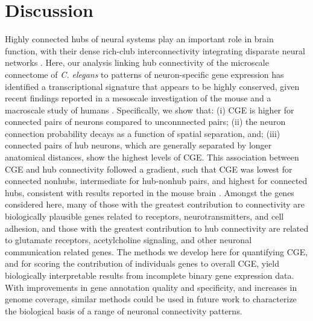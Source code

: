 \documentclass[10pt,letterpaper]{article}
\begin{document}
{\section*{Discussion}
Highly connected hubs of neural systems play an important role in brain function, with their dense rich-club interconnectivity integrating disparate neural networks \cite{vandenHeuvel:2013ge, Fornito2015, deReus:2013cy, vandenHeuvel:2013ij}.
Here, our analysis linking hub connectivity of the microscale connectome of \emph{C. elegans} to patterns of neuron-specific gene expression has identified a transcriptional signature that appears to be highly conserved, given recent findings reported in a mesoscale investigation of the mouse \cite{Fulcher:2016ck} and a macroscale study of humans \cite{Vertes2016a}.
Specifically, we show that:
(i) CGE is higher for connected pairs of neurons compared to unconnnected pairs;
(ii) the neuron connection probability decays as a function of spatial separation, and;
(iii) connected pairs of hub neurons, which are generally separated by longer anatomical distances, show the highest levels of CGE.
This association between CGE and hub connectivity followed a gradient, such that CGE was lowest for connected nonhubs, intermediate for hub-nonhub pairs, and highest for connected hubs, consistent with results reported in the mouse brain \cite{Fulcher:2016ck}.
Amongst the genes considered here, many of those with the greatest contribution to connectivity are biologically plausible genes related to receptors, neurotransmitters, and cell adhesion, and those with the greatest contribution to hub connectivity are related to glutamate receptors, acetylcholine signaling, and other neuronal communication related genes.
The methods we develop here for quantifying CGE, and for scoring the contribution of individuals genes to overall CGE, yield biologically interpretable results from incomplete binary gene expression data.
With improvements in gene annotation quality and specificity, and increases in genome coverage, similar methods could be used in future work to characterize the biological basis of a range of neuronal connectivity patterns.\\

}
\end{document}
